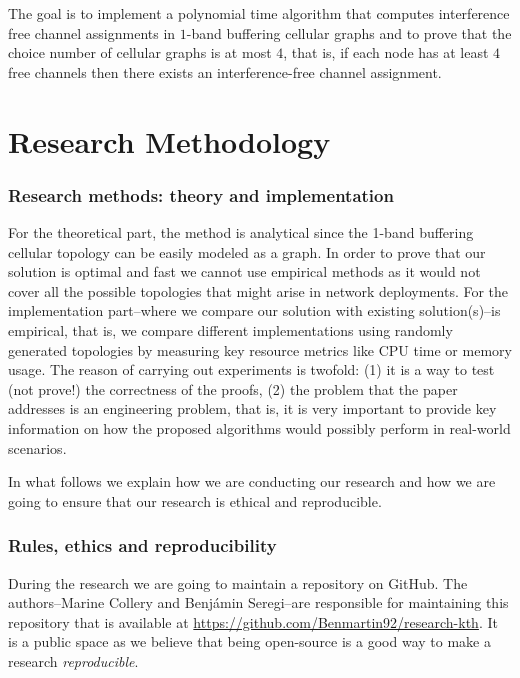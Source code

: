 \documentclass[letterpaper, 10 pt, conference]{ieeeconf}  %
\begin{document}
The goal is to implement a polynomial time algorithm that computes interference free channel assignments in $1$-band buffering cellular graphs and to prove that the choice number of cellular graphs is at most $4$, that is, if each node has at least $4$ free channels then there exists an interference-free channel assignment.

\section{Research Methodology}
\subsubsection*{Research methods: theory and implementation}
For the theoretical part, the method is analytical since the 1-band buffering cellular topology can be easily modeled as a graph. In order
to prove that our solution is optimal and fast we cannot use empirical methods as it would not cover all the possible
topologies that might arise in network deployments. For the implementation part\---where we compare our solution with existing solution(s)\---is empirical, that is, we compare different implementations using randomly generated topologies by measuring key resource metrics like CPU time or memory usage. The reason of carrying out experiments is twofold: (1) it is a way to test (not prove!) the correctness of the proofs, (2) the problem that the paper addresses is an engineering problem, that is, it is very important to provide key information on how the proposed algorithms would possibly perform in real-world scenarios.

In what follows we explain how we are conducting our research and how we are going to ensure that our research is ethical and reproducible.
\subsubsection*{Rules, ethics and reproducibility}
During the research we are going to maintain a repository on GitHub. The authors\---Marine Collery and Benjámin Seregi\---are responsible for maintaining this repository that is available at \url{https://github.com/Benmartin92/research-kth}. It is a public space as we believe that being open-source is a good way to make a research \textit{reproducible}.
\end{document}

